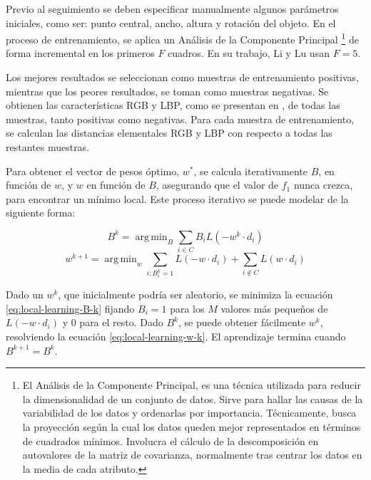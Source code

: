 \documentclass[a4paper,10pt]{article}
\DeclareMathOperator*{\argmin}{arg\,min}
\begin{document}
Previo al seguimiento se deben especificar manualmente algunos parámetros iniciales, 
como ser: punto central, ancho, altura y rotación del objeto. En el proceso de 
entrenamiento, se aplica un Análisis de la Componente Principal 
\footnote{El Análisis de la Componente Principal, es una técnica utilizada para reducir la dimensionalidad de un conjunto de datos. 
Sirve para hallar las causas de la variabilidad de los datos y ordenarlas por importancia.
Técnicamente, busca la proyección según la cual los datos queden mejor representados en términos de cuadrados mínimos. Involucra el cálculo de la descomposición en 
autovalores de la matriz de covarianza, normalmente tras centrar los datos en la media de cada atributo.}
de forma incremental en los primeros $F$ cuadros. En su trabajo, Li y Lu usan
$F = 5$.\cite{local-learning}

Los mejores resultados se seleccionan como muestras de entrenamiento positivas, mientras que
los peores resultados, se toman como muestras negativas. Se obtienen las características 
RGB y LBP, como se presentan en \cite{tracking-bag-of-features}, de todas las muestras, 
tanto positivas como negativas. Para cada muestra de entrenamiento, se calculan las 
distancias elementales RGB y LBP con respecto a todas las restantes muestras.

Para obtener el vector de pesos óptimo, $w^{*}$, se calcula iterativamente $B$, 
en función de $w$, y $w$ en función de $B$, asegurando que el valor de $f_{1}$ nunca 
crezca, para encontrar un mínimo local. Este proceso iterativo se puede modelar de la 
siguiente forma:

\begin{equation}
   \label{eq:local-learning-B-k}
   B^{k} = \argmin_{B} \sum_{i \in C} B_{i}L(-w^{k} \cdot d_{i})
\end{equation}
\begin{equation}
    \label{eq:local-learning-w-k}
    w^{k+1} = \argmin_{w} \sum_{i:B_{i}^{k}=1} L(-w \cdot d_{i}) + \sum_{i\notin C}L(w \cdot d_{i})
\end{equation}

Dado un $w^{k}$, que inicialmente podría ser aleatorio, se minimiza la ecuación 
\ref{eq:local-learning-B-k} fijando $B_{i} = 1$ para los $M$ valores más
pequeños de $L(-w \cdot d_{i})$ y $0$ para el resto. Dado $B^{k}$, se puede
obtener fácilmente $w^{k}$, resolviendo la ecuación \ref{eq:local-learning-w-k}. 
El aprendizaje termina cuando $B^{k+1}=B^{k}$.\\
\end{document}
